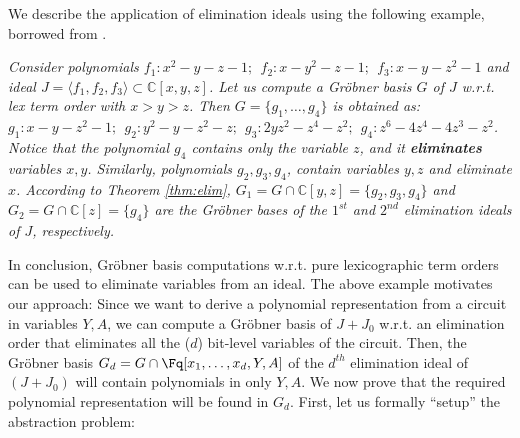We describe the application of elimination ideals using the following
example, borrowed from \cite{ideals:book}.

\begin{Example}

{\it 
Consider polynomials $f_1: x^2 - y - z - 1; ~~f_2: x - y^2 - z -1; 
~~f_3: x - y - z^2 - 1$ and ideal $J = \langle f_1, f_2, f_3\rangle
\subset {\mathbb{C}}[x, y, z]$. Let us compute a Gr\"obner basis $G$
of $J$ w.r.t. lex term order with $x > y > z$. Then $G = \{g_1, \dots,
g_4\}$ is obtained as: $g_1: x - y - z^2 - 1; ~~g_2: y^2 - y - z^2 - z;
~~g_3: 2yz^2 - z^4 - z^2; ~~g_4: z^6 - 4z^4 - 4z^3 - z^2$. 
Notice that the polynomial $g_4$ contains only the variable $z$, and
it {\bf eliminates} variables $x, y$. Similarly, polynomials $g_2,
g_3, g_4$, contain variables $y, z$ and eliminate $x$. According to
Theorem \ref{thm:elim}, $G_1 = G \cap {\mathbb{C}}[y, z] = \{g_2, g_3,
g_4\}$ and $G_2 = G \cap {\mathbb{C}}[z] = \{g_4\}$ are the Gr\"obner
bases of the $1^{st}$ and $2^{nd}$ elimination ideals of $J$, respectively.
}
\end{Example}

In conclusion, Gr\"obner basis computations w.r.t. pure lexicographic
term orders can be used to eliminate variables from an ideal. The
above example motivates our approach: Since we want to derive a
polynomial representation from a circuit in variables $Y, A$, we can
compute a Gr\"obner basis of $J + J_0$ w.r.t. an elimination order
that eliminates all the ($d$) bit-level variables of the
circuit. Then, the Gr\"obner basis $G_d = G \cap \Fq[x_1, \dots, x_d,
  Y, A]$ of the $d^{th}$ elimination ideal of $(J + J_0)$ will contain
polynomials in only $Y, A$. We now prove that the 
required polynomial representation will be found in $G_d$.
First, let us formally ``setup'' the abstraction problem:

